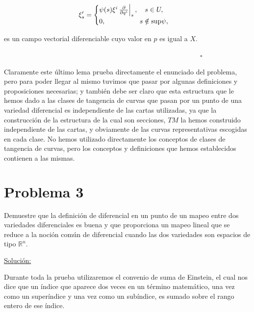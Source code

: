 \documentclass[a4paper,10pt]{article}
\numberwithin{equation}{section}
\newcommand{\zerodel}{.\kern-\nulldelimiterspace}
\begin{document}
\begin{equation}
 \xi'_s = \begin{cases}
           \psi(s)\xi^i \left\zerodel\frac{\partial}{\partial q^i}\right|_s, \quad s \in U, \\
           0, \qquad \qquad \quad s \notin \text{sup} \psi,
          \end{cases}
\end{equation}

es un campo vectorial diferenciable cuyo valor en $p$ es igual a $X$.

$\hspace{12cm} \square$

\vspace{.3cm}

Claramente este último lema prueba directamente el enunciado del problema, pero para 
poder llegar al mismo tuvimos que pasar por algunas definiciones y proposiciones 
necesarias; y también debe ser claro que esta estructura que le hemos dado a las 
clases de tangencia de curvas que pasan por un punto de una variedad diferencial 
es independiente de las cartas utilizadas, ya que la construcción de la estructura 
de la cual son secciones, $TM$ la hemos construido independiente de las cartas, y 
obviamente de las curvas representativas escogidas en cada clase. No hemos utilizado 
directamente los conceptos de clases de tangencia de curvas, pero los conceptos y 
definiciones que hemos establecidos contienen a las mismas.


\section{Problema 3}

Demuestre que la definición de diferencial en un punto de un mapeo entre dos variedades 
diferenciales es buena y que proporciona un mapeo lineal que se reduce a la noción 
común de diferencial cuando las dos variedades son espacios de tipo $\mathbb{R}^n$.

\vspace{.3cm}

\underline{Solución:} \vspace{.3cm}

Durante toda la prueba utilizaremos el convenio de suma de Einstein, el cual nos dice 
que un índice que aparece dos veces en un término matemático, una vez como un 
superíndice y una vez como un subíndice, es sumado sobre el rango entero de ese 
índice. 

\vspace{.3cm}
\end{document}
